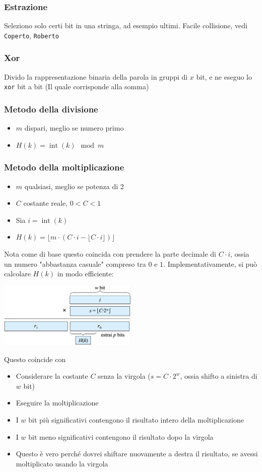 \subsubsection{Estrazione}
Seleziono solo certi bit in una stringa, ad esempio ultimi. Facile collisione, vedi \verb|Coperto|, \verb|Roberto|
\subsubsection{Xor}
Divido la rappresentazione binaria della parola in gruppi di $ x $ bit, e ne eseguo lo \verb|xor| bit a bit (Il quale corrisponde alla somma)
\subsubsection{Metodo della divisione}
\begin{itemize}
	\item $ m $ dispari, meglio se numero primo
	\item $ H\left(k\right) = \operatorname{int}\left(k\right) \mod m $
\end{itemize}
\subsubsection{Metodo della moltiplicazione}
\begin{itemize}
	\item $m$ qualsiasi, meglio se potenza di 2
	\item $C$ costante reale, $0<C<1$
	\item Sia $i=\operatorname{int}(k)$
	\item $H(k)=\lfloor m \cdot(C \cdot i-\lfloor C \cdot i\rfloor)\rfloor$
\end{itemize}
Nota come di base questo coincida con prendere la parte decimale di $ C \cdot i $, ossia un numero "abbastanza casuale" compreso tra $ 0 $ e $ 1 $.
\vskip3mm
Implementativamente, si può calcolare $ H(k) $ in modo efficiente:
\begin{center}
	\includegraphics[width = 0.5\textwidth]{Images/knuth multiplication hash.png}
\end{center}
Questo coincide con
\begin{itemize}
	\item Considerare la costante $ C $ senza la virgola ($ s = C \cdot 2^{w} $, ossia shifto a sinistra di $ w $ bit)
	\item Eseguire la moltiplicazione
	\item I $ w $ bit più significativi contengono il risultato intero della moltiplicazione
	\item I $ w $ bit meno significativi contengono il risultato dopo la virgola
	\item Questo è vero perché dovrei shiftare nuovamente a destra il risultato, se avessi moltiplicato usando la virgola
\end{itemize}

